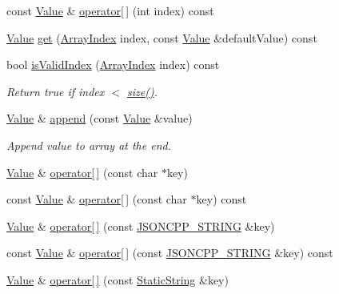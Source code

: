 \begin{DoxyCompactItemize}
\item 
const \hyperlink{class_json_1_1_value}{Value} \& \hyperlink{class_json_1_1_value_a1a081ad448db7a14ef87e79ef28762d2}{operator\mbox{[}$\,$\mbox{]}} (int index) const
\item 
\hyperlink{class_json_1_1_value}{Value} \hyperlink{class_json_1_1_value_a034eb7bf85a44fa759bdaa232788ca66}{get} (\hyperlink{class_json_1_1_value_a184a91566cccca7b819240f0d5561c7d}{Array\+Index} index, const \hyperlink{class_json_1_1_value}{Value} \&default\+Value) const
\item 
bool \hyperlink{class_json_1_1_value_ac2928f174a6e081c1500c28c2d61ee93}{is\+Valid\+Index} (\hyperlink{class_json_1_1_value_a184a91566cccca7b819240f0d5561c7d}{Array\+Index} index) const
\begin{DoxyCompactList}\small\item\em Return true if index $<$ \hyperlink{class_json_1_1_value_a0ec2808e1d7efa4e9fad938d6667be44}{size()}. \end{DoxyCompactList}\item 
\hyperlink{class_json_1_1_value}{Value} \& \hyperlink{class_json_1_1_value_a3b7c0ef3bb1958cafdf10483e93ed711}{append} (const \hyperlink{class_json_1_1_value}{Value} \&value)
\begin{DoxyCompactList}\small\item\em Append value to array at the end. \end{DoxyCompactList}\item 
\hyperlink{class_json_1_1_value}{Value} \& \hyperlink{class_json_1_1_value_aa744825e8edd61f538fa7e718f876dcc}{operator\mbox{[}$\,$\mbox{]}} (const char $\ast$key)
\item 
const \hyperlink{class_json_1_1_value}{Value} \& \hyperlink{class_json_1_1_value_a902b8d7b0bbb7a671ea0a5e3a8e936a3}{operator\mbox{[}$\,$\mbox{]}} (const char $\ast$key) const
\item 
\hyperlink{class_json_1_1_value}{Value} \& \hyperlink{class_json_1_1_value_ad504522a26d1019660b41bd7f85e3f4f}{operator\mbox{[}$\,$\mbox{]}} (const \hyperlink{config_8h_a1e723f95759de062585bc4a8fd3fa4be}{J\+S\+O\+N\+C\+P\+P\+\_\+\+S\+T\+R\+I\+NG} \&key)
\item 
const \hyperlink{class_json_1_1_value}{Value} \& \hyperlink{class_json_1_1_value_a0ec36099091b7c28c66c40e00df012fd}{operator\mbox{[}$\,$\mbox{]}} (const \hyperlink{config_8h_a1e723f95759de062585bc4a8fd3fa4be}{J\+S\+O\+N\+C\+P\+P\+\_\+\+S\+T\+R\+I\+NG} \&key) const
\item 
\hyperlink{class_json_1_1_value}{Value} \& \hyperlink{class_json_1_1_value_ac191343a7ee2ca54827d67d934200d4f}{operator\mbox{[}$\,$\mbox{]}} (const \hyperlink{class_json_1_1_static_string}{Static\+String} \&key)

\end{DoxyCompactItemize}
